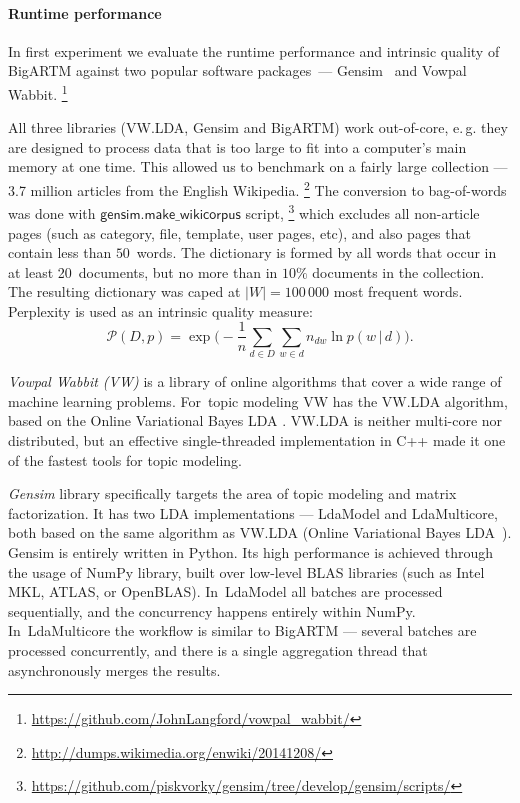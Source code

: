\documentclass{acm_proc_article-sp}
\newcommand{\cond}{\mspace{3mu}{|}\mspace{3mu}}
\newcommand{\kw}[1]{\textsf{#1}}
\begin{document}
\paragraph{Runtime performance}
In first experiment we evaluate the runtime performance and intrinsic quality of BigARTM
against two popular software packages~---
Gensim~\cite{rehurek10software}
and Vowpal Wabbit.%
\footnote{\url{https://github.com/JohnLangford/vowpal_wabbit/}}

All three libraries (VW.LDA, Gensim and BigARTM) work out-of-core,
e.\,g. they are designed to process data that is too large to fit into a computer's main memory at one time.
This allowed us to benchmark on a fairly large collection --- 3.7 million articles from the English Wikipedia.%
\footnote{\url{http://dumps.wikimedia.org/enwiki/20141208/}}
The conversion to bag-of-words was done with $\kw{gensim.make\_wikicorpus}$ script,%
\footnote{\url{https://github.com/piskvorky/gensim/tree/develop/gensim/scripts/}}
which excludes all non-article pages (such as category, file, template, user pages, etc),
and also pages that contain less than $50$~words.
The dictionary is formed by all words that occur in at least 20~documents,
but no more than in $10\%$ documents in the collection.
The resulting dictionary was caped at $|W| = 100\,000$ most frequent words.
Perplexity is used as an intrinsic quality measure:
\begin{equation}
    \label{eq:perplexity}
    \mathscr{P}(D, p) =
        \exp \biggl( - \frac{1}{n} \sum_{d \in D} \sum_{w \in d} n_{dw} \ln p(w \cond d) \biggr).
\end{equation}

\emph{Vowpal Wabbit (VW)} is a library
of online algorithms that cover a wide range of machine learning problems. %
For~topic modeling VW has the VW.LDA algorithm, based on the Online Variational Bayes LDA \cite{hoffman10online}.
VW.LDA is neither multi-core nor distributed,
but an effective single-threaded implementation in C++ made it one of the fastest tools for topic modeling.%

\emph{Gensim} library specifically targets the area of topic modeling and matrix factorization.
It has two LDA implementations --- LdaModel and LdaMulticore,
both based on the same algorithm as VW.LDA (Online Variational Bayes LDA~\cite{hoffman10online}).
Gensim is entirely written in Python. Its high performance is achieved through the usage of NumPy library,
built over low-level BLAS libraries (such as Intel MKL, ATLAS, or OpenBLAS).
In~LdaModel all batches are processed sequentially, and the concurrency happens entirely within NumPy. %
In~LdaMulticore the workflow is similar to \mbox{BigARTM} --- several batches are processed concurrently,
and there is a single aggregation thread that asynchronously merges the results.
\end{document}
